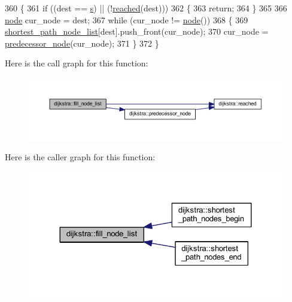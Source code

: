 \begin{DoxyCode}
360 \{
361     \textcolor{keywordflow}{if} ((dest == \mbox{\hyperlink{classdijkstra_a721bfb648626a1be2b9d276d85ebdb9d}{s}}) || (!\mbox{\hyperlink{classdijkstra_a405ff80abfc9ad98668534032eed6a5b}{reached}}(dest)))
362     \{
363     \textcolor{keywordflow}{return};
364     \}
365 
366     \mbox{\hyperlink{classnode}{node}} cur\_node = dest;
367     \textcolor{keywordflow}{while} (cur\_node != \mbox{\hyperlink{classnode}{node}}())
368     \{
369     \mbox{\hyperlink{classdijkstra_a67b45d0af528737830ea559ee42c4685}{shortest\_path\_node\_list}}[dest].push\_front(cur\_node);
370     cur\_node = \mbox{\hyperlink{classdijkstra_a99c17ee7c2b55574ea8c2952fac09faf}{predecessor\_node}}(cur\_node);
371     \}
372 \}
\end{DoxyCode}
Here is the call graph for this function\+:\nopagebreak
\begin{figure}[H]
\begin{center}
\leavevmode
\includegraphics[width=350pt]{classdijkstra_a71ad317c485ce76d3d22399f1a8c83fe_cgraph}
\end{center}
\end{figure}
Here is the caller graph for this function\+:\nopagebreak
\begin{figure}[H]
\begin{center}
\leavevmode
\includegraphics[width=324pt]{classdijkstra_a71ad317c485ce76d3d22399f1a8c83fe_icgraph}
\end{center}
\end{figure}
\mbox{\label{classdijkstra_a6dafb552780e09a56b87e2a33a98e74b}} 
